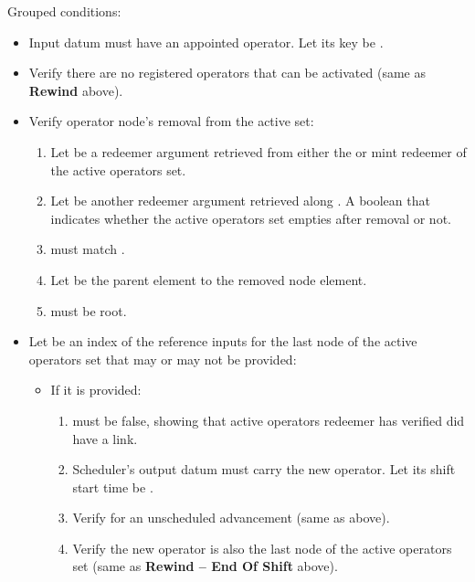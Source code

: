\documentclass[../midgard.tex]{subfiles}
\begin{document}
\begin{description}
      Grouped conditions:
      \begin{itemize}
        \item Input datum must have an appointed operator.
          Let its key be .
        \item Verify there are no registered operators that can be activated (same as \textbf{Rewind} above).
        \item Verify operator node's removal from the active set:
          \begin{enumerate}
            \item Let  be a redeemer argument retrieved from either the  or  mint redeemer of the active operators set.
            \item Let  be another redeemer argument retrieved along .
              A boolean that indicates whether the active operators set empties after removal or not.
            \item {} must match .
            \item Let  be the parent element to the removed node element.
            \item {} must be root.
          \end{enumerate}
        \item Let  be an index of the reference inputs for the last node of the active operators set that may or may not be provided:
          \begin{itemize}
            \item If it is provided:
              \begin{enumerate}[resume]
                \item {} must be false, showing that active operators redeemer has verified  did have a link.
                \item Scheduler's output datum must carry the new operator.
                  Let its shift start time be .
                \item Verify  for an unscheduled advancement (same as above).
                \item Verify the new operator is also the last node of the active operators set (same as \textbf{Rewind -- End Of Shift} above).
              \end{enumerate}

\end{itemize}
\end{itemize}
\end{description}
\end{document}
